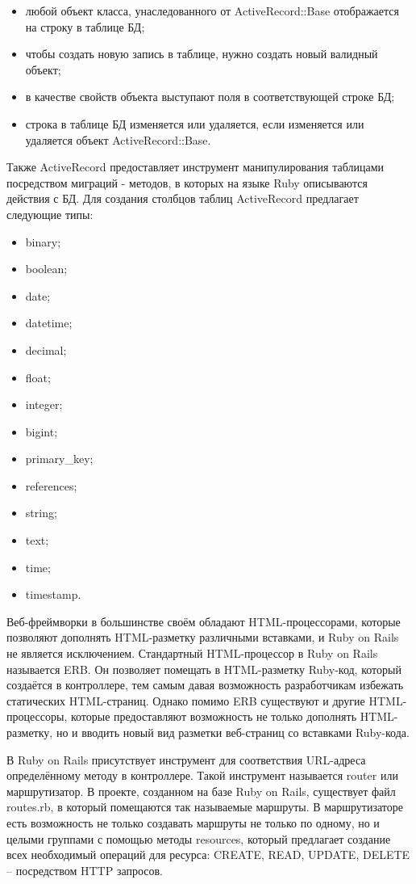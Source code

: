 \begin{itemize}
  \item любой объект класса, унаследованного от ActiveRecord::Base отображается на строку в таблице БД;
  \item чтобы создать новую запись в таблице, нужно создать новый валидный объект;
  \item в качестве свойств объекта выступают поля в соответствующей строке БД;
  \item строка в таблице БД изменяется или удаляется, если изменяется или удаляется объект ActiveRecord::Base.
\end{itemize}

Также ActiveRecord предоставляет инструмент манипулирования таблицами посредством миграций - методов, в которых на языке Ruby описываются действия с БД. Для создания столбцов таблиц ActiveRecord предлагает следующие типы:

\begin{itemize}
  \item binary;
  \item boolean;
  \item date;
  \item datetime;
  \item decimal;
  \item float;
  \item integer;
  \item bigint;
  \item primary\_key;
  \item references;
  \item string;
  \item text;
  \item time;
  \item timestamp.
\end{itemize}

Веб-фреймворки в большинстве своём обладают HTML-процессорами, которые позволяют дополнять HTML-разметку различными вставками, и Ruby on Rails не является исключением. Стандартный HTML-процессор в Ruby on Rails называется ERB. Он позволяет помещать в HTML-разметку Ruby-код, который создаётся в контроллере, тем самым давая возможность разработчикам избежать статических HTML-страниц. Однако помимо ERB существуют и другие HTML-процессоры, которые предоставляют возможность не только дополнять HTML-разметку, но и вводить новый вид разметки веб-страниц со вставками Ruby-кода.

В Ruby on Rails присутствует инструмент для соответствия URL-адреса определённому методу в контроллере. Такой инструмент называется router или маршрутизатор. В проекте, созданном на базе Ruby on Rails, существует файл routes.rb, в который помещаются так называемые маршруты. В маршрутизаторе есть возможность не только создавать маршруты не только по одному, но и целыми группами с помощью методы resources, который предлагает создание всех необходимый операций для ресурса: CREATE, READ, UPDATE, DELETE -- посредством HTTP запросов.

